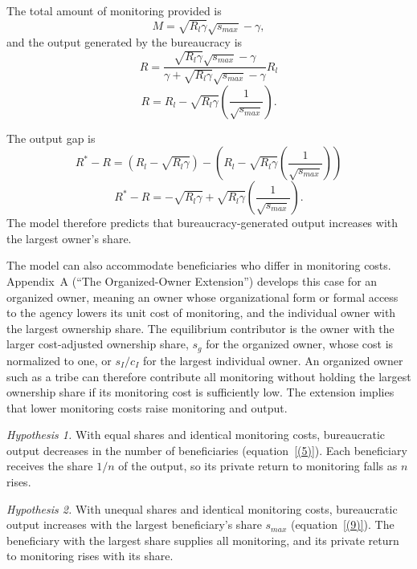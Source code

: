 \documentclass[12pt]{article}
\begin{document}
The total amount of monitoring provided is
\begin{equation} \label{(8)}
    M = \sqrt{R_l \gamma}\sqrt{s_{max}}-\gamma,
\end{equation}
\noindent
and the output generated by the bureaucracy is
\begin{equation}
    R = \frac{\sqrt{R_l \gamma}\sqrt{s_{max}}-\gamma}{\gamma + \sqrt{R_l \gamma}\sqrt{s_{max}} - \gamma}R_l \nonumber
\end{equation}
\begin{equation} \label{(9)}
    R = R_l -\sqrt{R_l\gamma}\left(\frac{1}{\sqrt{s_{max}}}\right).
\end{equation}

\noindent
The output gap is
\begin{equation}
    R^*-R = (R_l -\sqrt{R_l \gamma})-(R_l -\sqrt{R_l\gamma}\left(\frac{1}{\sqrt{s_{max}}}\right)) \nonumber
\end{equation}
\begin{equation} \label{(10)}
    R^*-R =-\sqrt{R_l\gamma} + \sqrt{R_l\gamma}\left(\frac{1}{\sqrt{s_{max}}}\right).
\end{equation}
\noindent
The model therefore predicts that bureaucracy-generated output increases with the largest owner's share.

The model can also accommodate beneficiaries who differ in monitoring costs. Appendix~A (``The Organized-Owner Extension'') develops this case for an organized owner, meaning an owner whose organizational form or formal access to the agency lowers its unit cost of monitoring, and the individual owner with the largest ownership share. The equilibrium contributor is the owner with the larger cost-adjusted ownership share, $s_g$ for the organized owner, whose cost is normalized to one, or $s_I/c_I$ for the largest individual owner. An organized owner such as a tribe can therefore contribute all monitoring without holding the largest ownership share if its monitoring cost is sufficiently low. The extension implies that lower monitoring costs raise monitoring and output.

\smallskip\noindent\textit{Hypothesis 1.} With equal shares and identical monitoring costs, bureaucratic output decreases in the number of beneficiaries (equation~\eqref{(5)}). Each beneficiary receives the share $1/n$ of the output, so its private return to monitoring falls as $n$ rises.

\smallskip\noindent\textit{Hypothesis 2.} With unequal shares and identical monitoring costs, bureaucratic output increases with the largest beneficiary's share $s_{max}$ (equation~\eqref{(9)}). The beneficiary with the largest share supplies all monitoring, and its private return to monitoring rises with its share.
\end{document}
